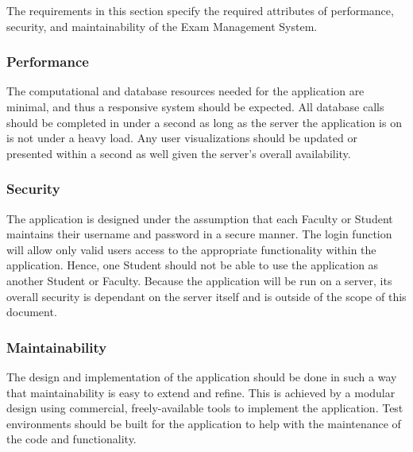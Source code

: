 
The requirements in this section specify the required attributes
 of performance,
security, and maintainability of the Exam Management System.

\subsubsection{Performance} 

The computational and database resources needed for the application are minimal,
and thus a responsive system should be expected. All database calls should be
completed in under a second as long as the server the application is on is not
under a heavy load. Any user visualizations should be updated or presented
within a second as well given the server's overall availability.

\subsubsection{Security} 

The application is designed under the assumption that each Faculty or Student
maintains their username and password in a secure manner. The login function
will allow only valid users access to the appropriate functionality within the
application. Hence, one Student should not be able to use the application as
another Student or Faculty. Because the application will be run on a server,
its overall security is dependant on the server itself and is outside of the
scope of this document.

\subsubsection{Maintainability} 

The design and implementation of the application should be done in such a way
that maintainability is easy to extend and refine. This is achieved by a
modular design using commercial, freely-available tools to implement the
application. Test environments should be built for the application to help with
the maintenance of the code and functionality.
